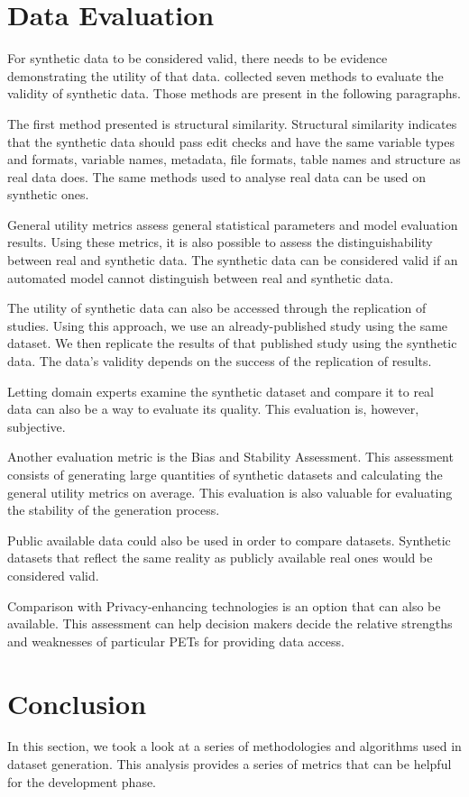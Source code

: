 \section{Data Evaluation}
For synthetic data to be considered valid, there needs to be evidence demonstrating the utility of that data. \cite{7waystodie} collected seven methods to evaluate the validity of synthetic data. Those methods are present in the following paragraphs.

The first method presented is structural similarity. Structural similarity indicates that the synthetic data should pass edit checks and have the same variable types and formats, variable names, metadata, file formats, table names and structure as real data does. The same methods used to analyse real data can be used on synthetic ones. 

General utility metrics assess general statistical parameters and model evaluation results. Using these metrics, it is also possible to assess the distinguishability between real and synthetic data. The synthetic data can be considered valid if an automated model cannot distinguish between real and synthetic data.

The utility of synthetic data can also be accessed through the replication of studies. Using this approach, we use an already-published study using the same dataset. We then replicate the results of that published study using the synthetic data. The data's validity depends on the success of the replication of results.

Letting domain experts examine the synthetic dataset and compare it to real data can also be a way to evaluate its quality. This evaluation is, however, subjective. 

Another evaluation metric is the Bias and Stability Assessment. This assessment consists of generating large quantities of synthetic datasets and calculating the general utility metrics on average. This evaluation is also valuable for evaluating the stability of the generation process.

Public available data could also be used in order to compare datasets. Synthetic datasets that reflect the same reality as publicly available real ones would be considered valid.

Comparison with Privacy-enhancing technologies is an option that can also be available. This assessment can help decision makers decide the relative strengths and weaknesses of particular PETs for providing data access.

\section{Conclusion}
In this section, we took a look at a series of methodologies and algorithms used in dataset generation. This analysis provides a series of metrics that can be helpful for the development phase.

